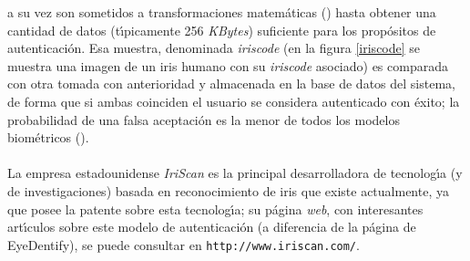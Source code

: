 a su vez son sometidos a transformaciones matem\'aticas (\cite{kn:mcm97}) hasta 
obtener una 
cantidad de datos (t\'{\i}picamente 256 {\it KBytes}) suficiente para
los prop\'ositos de autenticaci\'on. Esa muestra, denominada {\it iriscode} 
(en la figura \ref{iriscode} se muestra una imagen de un iris humano con su 
{\it iriscode} asociado) es comparada con otra tomada
con anterioridad y almacenada en la base de datos del sistema, de forma que si
ambas coinciden el usuario se considera autenticado con \'exito; la 
probabilidad de una falsa aceptaci\'on es la menor de todos los modelos
biom\'etricos (\cite{kn:dau98}).\\
\\La empresa estadounidense {\it IriScan} es la principal desarrolladora de
tecnolog\'{\i}a (y de investigaciones) basada en reconocimiento de iris que
existe actualmente, ya que posee la patente sobre esta tecnolog\'{\i}a; 
su p\'agina {\it web}, con interesantes art\'{\i}culos sobre este modelo de 
autenticaci\'on (a diferencia de la p\'agina de EyeDentify), se puede consultar 
en {\tt http://www.iriscan.com/}.
